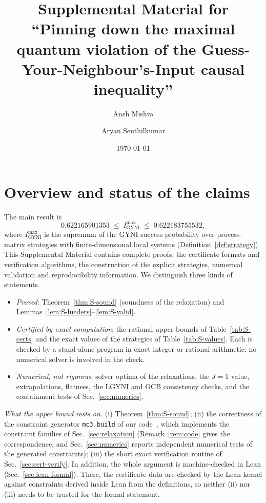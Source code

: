 \documentclass[aps,pra,onecolumn,notitlepage,superscriptaddress,longbibliography,nofootinbib,11pt]{revtex4-2}
\theoremstyle{remark}
\newcommand{\Imax}{I_{\mathrm{GYNI}}^{\max}}
\newcommand{\file}[1]{\texttt{#1}}
\begin{document}
\title{Supplemental Material for ``Pinning down the maximal quantum violation of the Guess-Your-Neighbour's-Input causal inequality''}

\author{Ansh Mishra}
\author{Aryan Senthilkumar}
\noaffiliation

\date{\today}

\maketitle

\section{Overview and status of the claims}\label{sec:overview}

The main result is
\begin{equation}
0.622165901353\;\le\;\Imax\;\le\;0.622183755532 ,
\label{eq:S-main}
\end{equation}
where $\Imax$ is the supremum of the GYNI success probability over process-matrix strategies with finite-dimensional local systems (Definition~\ref{def:strategy}). This Supplemental Material contains complete proofs, the certificate formats and verification algorithms, the construction of the explicit strategies, numerical validation and reproducibility information. We distinguish three kinds of statements.
\begin{itemize}
\item \emph{Proved}: Theorem~\ref{thm:S-sound} (soundness of the relaxation) and Lemmas~\ref{lem:S-lueders}--\ref{lem:S-valid}.
\item \emph{Certified by exact computation}: the rational upper bounds of Table~\ref{tab:S-certs} and the exact values of the strategies of Table~\ref{tab:S-values}. Each is checked by a stand-alone program in exact integer or rational arithmetic; no numerical solver is involved in the check.
\item \emph{Numerical, not rigorous}: solver optima of the relaxations, the $J=1$ value, extrapolations, flatness, the LGYNI and OCB consistency checks, and the containment tests of Sec.~\ref{sec:numerics}.
\end{itemize}

\emph{What the upper bound rests on.} (i) Theorem~\ref{thm:S-sound}; (ii) the correctness of the constraint generator \file{mc3.build} of our code~\cite{repo}, which implements the constraint families of Sec.~\ref{sec:relaxation} (Remark~\ref{rem:code} gives the correspondence, and Sec.~\ref{sec:numerics} reports independent numerical tests of the generated constraints); (iii) the short exact verification routine of Sec.~\ref{sec:cert-verify}. In addition, the whole argument is machine-checked in Lean (Sec.~\ref{sec:lean-formal}). There, the certificate data are checked by the Lean kernel against constraints derived inside Lean from the definitions, so neither (ii) nor (iii) needs to be trusted for the formal statement.
\end{document}
